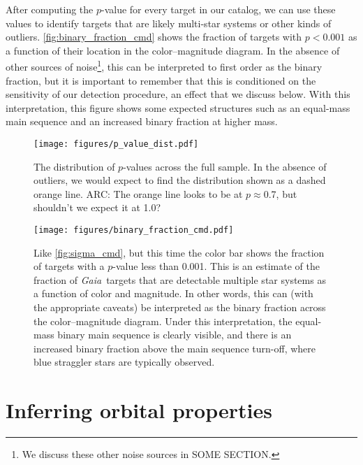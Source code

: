 \documentclass[modern, letterpaper]{aastex631}
\newcommand{\project}[1]{\textsl{#1}}
\newcommand{\Gaia}{\project{Gaia}}
\begin{document}
After computing the $p$-value for every target in our catalog, we can use these values to identify targets that are likely multi-star systems or other kinds of outliers.
\autoref{fig:binary_fraction_cmd} shows the fraction of targets with $p < 0.001$ as a function of their location in the color--magnitude diagram.
In the absence of other sources of noise\footnote{We discuss these other noise sources in SOME SECTION.}, this can be interpreted to first order as the binary fraction, but it is important to remember that this is conditioned on the sensitivity of our detection procedure, an effect that we discuss below.
With this interpretation, this figure shows some expected structures such as an equal-mass main sequence and an increased binary fraction at higher mass.

\begin{figure}
	\begin{centering}
		\texttt{[image: figures/p\_value\_dist.pdf]}
		\caption{The distribution of $p$-values across the full sample. In the absence of outliers, we would expect to find the distribution shown as a dashed orange line. ARC: The orange line looks to be at $p \approx$0.7, but shouldn't we expect it at 1.0?}
		\label{fig:p_value_dist}
	\end{centering}
\end{figure}

\begin{figure}
	\begin{centering}
		\texttt{[image: figures/binary\_fraction\_cmd.pdf]}
		\caption{Like \autoref{fig:sigma_cmd}, but this time the color bar shows the fraction of targets with a $p$-value less than 0.001. This is an estimate of the fraction of \Gaia\ targets that are detectable multiple star systems as a function of color and magnitude. In other words, this can (with the appropriate caveats) be interpreted as the binary fraction across the color--magnitude diagram. Under this interpretation, the equal-mass binary main sequence is clearly visible, and there is an increased binary fraction above the main sequence turn-off, where blue straggler stars are typically observed.}
		\label{fig:binary_fraction_cmd}
	\end{centering}
\end{figure}


\section{Inferring orbital properties}
\end{document}
